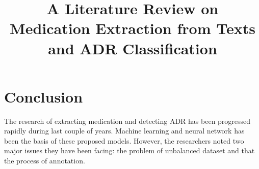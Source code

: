 \documentclass[12pt,conference]{IEEEtran}
\begin{document}
	
	\title{A Literature Review on Medication Extraction from Texts and ADR Classification}
	
	\author{
	}
	
	\maketitle
	
	
	
	
	
	
	
	
	
	
	
	
	\section{Conclusion}
		The research of extracting medication and detecting ADR has been progressed rapidly during last couple of years. Machine learning and neural network has been the basis of these proposed models. However, the researchers noted two major issues they have been facing: the problem of unbalanced dataset and that the process of annotation. 
	
	
	
\end{document}
